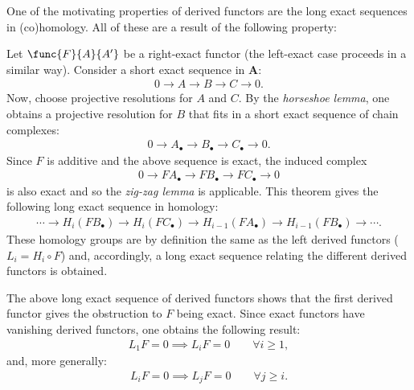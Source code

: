 	One of the motivating properties of derived functors are the long exact sequences in (co)homology. All of these are a result of the following property:
	\begin{property}
		Let $\func{F}{A}{A'}$ be a right-exact functor (the left-exact case proceeds in a similar way). Consider a short exact sequence in $\mathbf{A}$:
		\begin{gather}
			0\longrightarrow A\longrightarrow B\longrightarrow C\longrightarrow 0.
		\end{gather}
		Now, choose projective resolutions for $A$ and $C$. By the \textit{horseshoe lemma}, one obtains a projective resolution for $B$ that fits in a short exact sequence of chain complexes:
		\begin{gather}
			0\longrightarrow A_\bullet\longrightarrow B_\bullet\longrightarrow C_\bullet\longrightarrow 0.
		\end{gather}
		Since $F$ is additive and the above sequence is exact, the induced complex
		\begin{gather}
			0\longrightarrow FA_\bullet\longrightarrow FB_\bullet\longrightarrow FC_\bullet\longrightarrow0
		\end{gather}
		is also exact and so the \textit{zig-zag lemma} is applicable. This theorem gives the following long exact sequence in homology:
		\begin{gather}
			\cdots\longrightarrow H_i(FB_\bullet)\longrightarrow H_i(FC_\bullet) \longrightarrow H_{i-1}(FA_\bullet) \longrightarrow H_{i-1}(FB_\bullet) \longrightarrow\cdots.
		\end{gather}
		These homology groups are by definition the same as the left derived functors ($L_i = H_i\circ F$) and, accordingly, a long exact sequence relating the different derived functors is obtained.
	\end{property}
	\begin{result}
		The above long exact sequence of derived functors shows that the first derived functor gives the obstruction to $F$ being exact. Since exact functors have vanishing derived functors, one obtains the following result:
		\begin{gather}
			L_1F = 0\implies L_iF=0\qquad\forall i\geq 1,
		\end{gather}
        and, more generally:
        \begin{gather}
            L_iF = 0\implies L_jF=0\qquad\forall j\geq i.
        \end{gather}
	\end{result}

